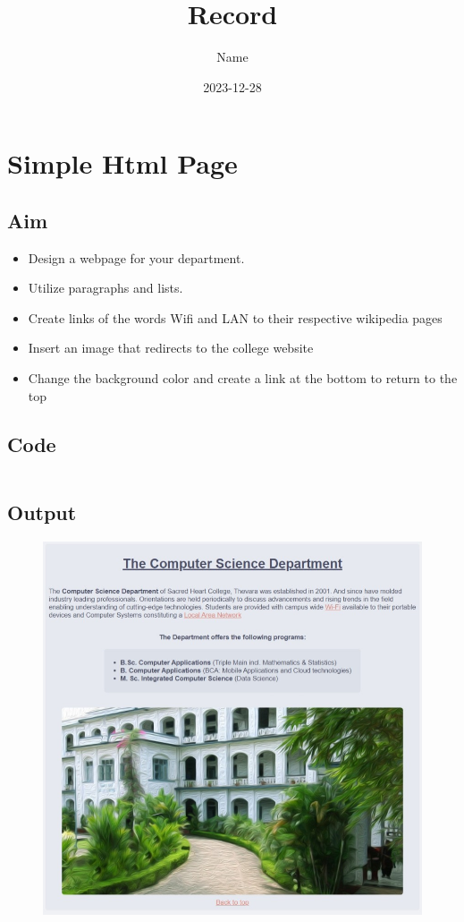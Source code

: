 \documentclass{article}
\title{Record}
\author{Name}
\date{2023-12-28}
\begin{document}

\newpage
\tableofcontents
\newpage


\section{Simple Html Page}
\subsection{Aim}
\begin{itemize}
	\item Design a webpage for your department.
	\item Utilize paragraphs and lists.
	\item Create links of the words Wifi and LAN to their respective wikipedia pages
	\item Insert an image that redirects to the college website
	\item Change the background color and create a link at the bottom to return to the top
\end{itemize}

\subsection{Code}
\inputminted[frame=lines, breaklines, breakanywhere, numberblanklines=false]{html}{./prog_1/index.html}

\newpage
\subsection{Output}
\begin{figure}[h!]
	\centering
	\includegraphics[width=1\textwidth]{./Assets/p0101.jpeg}
\end{figure}
\newpage
\end{document}
